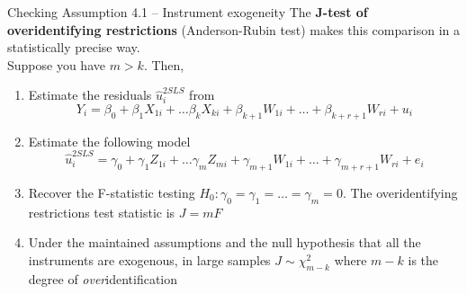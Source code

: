 \documentclass[notes,10pt, aspectratio=169]{beamer}
\begin{document}
\begin{frame}{Checking Assumption 4.1 -- Instrument exogeneity}
The \textbf{J-test of overidentifying restrictions} (Anderson-Rubin test) makes this comparison in a statistically precise way.\\[1em]

Suppose you have $m>k$. Then,
\begin{enumerate}
    \item Estimate the residuals $\hat{u}^{2SLS}_i$ from
    \begin{equation*}
        Y_i = \beta_0 + \beta_1 X_{1i} + \dots   \beta_k X_{ki} +  \beta_{k+1} W_{1i} + \dots + \beta_{k+r+1} W_{ri} + u_i
    \end{equation*}
    \item Estimate the following model
    \begin{equation*}
        \hat{u}^{2SLS}_i = \gamma_0 + \gamma_1 Z_{1i} + \dots   \gamma_m Z_{mi} +  \gamma_{m+1} W_{1i} + \dots + \gamma_{m+r+1} W_{ri} + e_i
    \end{equation*}
    \item Recover the F-statistic testing $H_0: \gamma_0=\gamma_1=\dots=\gamma_m=0$. The overidentifying restrictions test statistic is $J = mF$
    \item Under the maintained assumptions and the null hypothesis that all the instruments
are exogenous, in large samples $J\sim\chi^2_{m-k}$ where $m-k$ is the degree of \textit{over}identification
\end{enumerate}
\end{frame}
\end{document}

